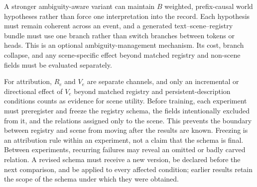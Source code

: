 \documentclass[11pt]{article}
\begin{document}
A stronger ambiguity-aware variant can maintain $B$ weighted, prefix-causal world hypotheses rather than force one interpretation into the record. Each hypothesis must remain coherent across an event, and a generated text--scene--registry bundle must use one branch rather than switch branches between tokens or heads. This is an optional ambiguity-management mechanism. Its cost, branch collapse, and any scene-specific effect beyond matched registry and non-scene fields must be evaluated separately.

For attribution, $R_e$ and $V_e$ are separate channels, and only an incremental or directional effect of $V_e$ beyond matched registry and persistent-description conditions counts as evidence for scene utility. Before training, each experiment must preregister and freeze the registry schema, the fields intentionally excluded from it, and the relations assigned only to the scene. This prevents the boundary between registry and scene from moving after the results are known. Freezing is an attribution rule within an experiment, not a claim that the schema is final. Between experiments, recurring failures may reveal an omitted or badly carved relation. A revised schema must receive a new version, be declared before the next comparison, and be applied to every affected condition; earlier results retain the scope of the schema under which they were obtained.
\end{document}
